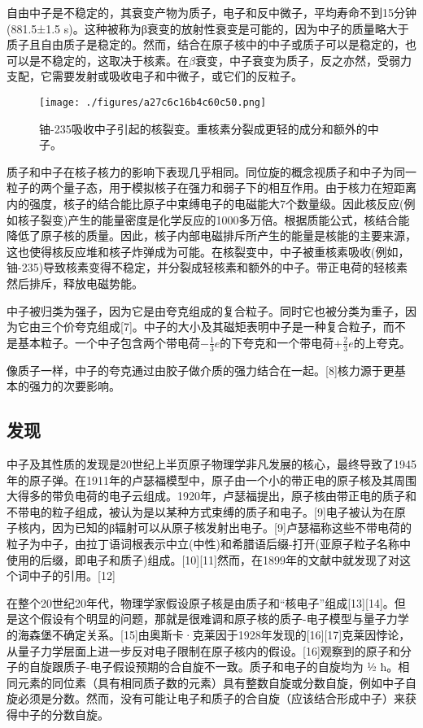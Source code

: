 自由中子是不稳定的，其衰变产物为质子，电子和反中微子，平均寿命不到15分钟(881.5±1.5 s)。这种被称为β衰变的放射性衰变是可能的，因为中子的质量略大于质子且自由质子是稳定的。然而，结合在原子核中的中子或质子可以是稳定的，也可以是不稳定的，这取决于核素。在$\beta$衰变，中子衰变为质子，反之亦然，受弱力支配，它需要发射或吸收电子和中微子，或它们的反粒子。
\begin{figure}[ht]
\centering
\texttt{[image: ./figures/a27c6c16b4c60c50.png]}
\caption{铀-235吸收中子引起的核裂变。重核素分裂成更轻的成分和额外的中子。} \label{fig_Neutro_1}
\end{figure}
质子和中子在核子核力的影响下表现几乎相同。同位旋的概念视质子和中子为同一粒子的两个量子态，用于模拟核子在强力和弱子下的相互作用。由于核力在短距离内的强度，核子的结合能比原子中束缚电子的电磁能大7个数量级。因此核反应(例如核子裂变)产生的能量密度是化学反应的1000多万倍。根据质能公式，核结合能降低了原子核的质量。因此，核子内部电磁排斥所产生的能量是核能的主要来源，这也使得核反应堆和核子炸弹成为可能。在核裂变中，中子被重核素吸收(例如，铀-235)导致核素变得不稳定，并分裂成轻核素和额外的中子。带正电荷的轻核素然后排斥，释放电磁势能。

中子被归类为强子，因为它是由夸克组成的复合粒子。同时它也被分类为重子，因为它由三个价夸克组成[7]。中子的大小及其磁矩表明中子是一种复合粒子，而不是基本粒子。一个中子包含两个带电荷$-\frac{1}{3}e$的下夸克和一个带电荷$+\frac{2}{3}e$的上夸克。

像质子一样，中子的夸克通过由胶子做介质的强力结合在一起。[8]核力源于更基本的强力的次要影响。

\subsection{发现}
中子及其性质的发现是20世纪上半页原子物理学非凡发展的核心，最终导致了1945年的原子弹。在1911年的卢瑟福模型中，原子由一个小的带正电的原子核及其周围大得多的带负电荷的电子云组成。1920年，卢瑟福提出，原子核由带正电的质子和不带电的粒子组成，被认为是以某种方式束缚的质子和电子。[9]电子被认为在原子核内，因为已知的β辐射可以从原子核发射出电子。[9]卢瑟福称这些不带电荷的粒子为中子，由拉丁语词根表示中立(中性)和希腊语后缀-打开(亚原子粒子名称中使用的后缀，即电子和质子)组成。[10][11]然而，在1899年的文献中就发现了对这个词中子的引用。[12]

在整个20世纪20年代，物理学家假设原子核是由质子和“核电子”组成[13][14]。但是这个假设有个明显的问题，那就是很难调和原子核的质子-电子模型与量子力学的海森堡不确定关系。[15]由奥斯卡·克莱因于1928年发现的[16][17]克莱因悖论，从量子力学层面上进一步反对电子限制在原子核内的假设。[16]观察到的原子和分子的自旋跟质子-电子假设预期的合自旋不一致。质子和电子的自旋均为 ½ ħ。相同元素的同位素（具有相同质子数的元素）具有整数自旋或分数自旋，例如中子自旋必须是分数。然而，没有可能让电子和质子的合自旋（应该结合形成中子）来获得中子的分数自旋。


